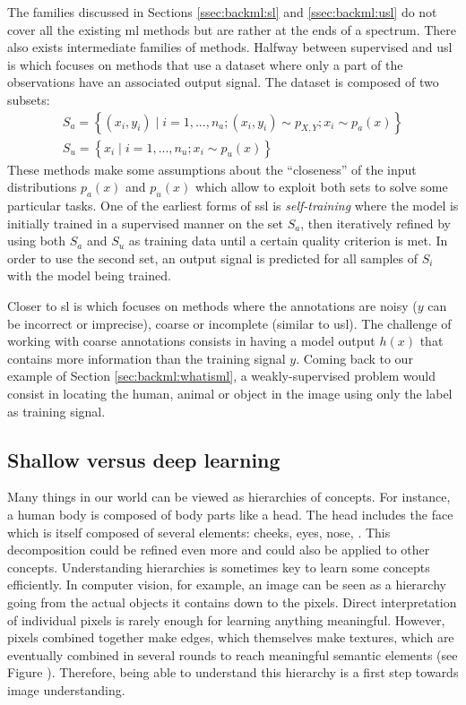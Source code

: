 The families discussed in Sections \ref{ssec:backml:sl} and \ref{ssec:backml:usl} do not cover all the existing \acrlong{ml} methods but are rather at the ends of a spectrum. There also exists intermediate families of methods. Halfway between supervised and \acrlong{usl} is  which focuses on methods that use a dataset where only a part of the observations have an associated output signal. The dataset is composed of two subsets:
\begin{eqnarray}
S_a = \left\{(x_i, y_i) \mid i = 1,...,n_a; (x_i, y_i) \sim p_{X,Y}; x_i \sim p_a(x)\right\} \\
S_u = \left\{x_i \mid i = 1,...,n_u; x_i \sim p_u(x)\right\}
\end{eqnarray}
These  methods make some assumptions about the ``closeness'' of the input distributions $p_a(x)$ and $p_u(x)$ \parencite{chapelle2006semi} which allow to exploit both sets to solve some particular tasks. One of the earliest forms of \acrlong{ssl} is \textit{self-training} where the model is initially trained in a supervised manner on the set $S_a$, then iteratively refined by using both $S_a$ and $S_u$ as training data until a certain quality criterion is met. In order to use the second set, an output signal is predicted for all samples of $S_i$ with the model being trained. 

Closer to \acrlong{sl} is  which focuses on methods where the annotations are noisy (\eg $y$ can be incorrect or imprecise), coarse or incomplete (similar to \acrlong{usl}). The challenge of working with coarse annotations consists in having a model output $h(x)$ that contains more information than the training signal $y$. Coming back to our example of Section \ref{sec:backml:whatisml}, a weakly-supervised problem would consist in locating the human, animal or object in the image using only the label as training signal.


\subsection{Shallow versus deep learning}

Many things in our world can be viewed as hierarchies of concepts. For instance, a human body is composed of body parts like a head. The head includes the face which is itself composed of several elements: cheeks, eyes, nose, \etc. This decomposition could be refined even more and could also be applied to other concepts. Understanding hierarchies is sometimes key to learn some concepts efficiently. In computer vision, for example, an image can be seen as a hierarchy going from the actual objects it contains down to the pixels. Direct interpretation of individual pixels is rarely enough for learning anything meaningful. However, pixels combined together make edges, which themselves make textures, which are eventually combined in several rounds to reach meaningful semantic elements (see Figure ). Therefore, being able to understand this hierarchy is a first step towards image understanding.   

